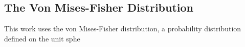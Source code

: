 \subsection{The Von Mises-Fisher Distribution}

This work uses the von Mises-Fisher distribution, a probability distribution defined on the unit sphe